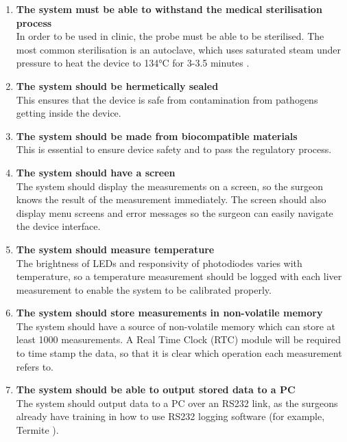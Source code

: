 \begin{enumerate}
\item \label{req: sterilise} \textbf{The system must be able to withstand the medical sterilisation process}\\
In order to be used in clinic, the probe must be able to be sterilised. The most common sterilisation is an autoclave, which uses saturated steam under pressure to heat the device to 134\si{\celsius} for 3-3.5 minutes \cite{nhs_autoclave}.

\item \label{req: seal} \textbf{The system should be hermetically sealed}\\
This ensures that the device is safe from contamination from pathogens getting inside the device.

\item \label{req: biocompatible} \textbf{The system should be made from biocompatible materials}\\
This is essential to ensure device safety and to pass the regulatory process.




\item \label{req: screen} \textbf{The system should have a screen}\\
The system should display the measurements on a screen, so the surgeon knows the result of the measurement immediately. The screen should also display menu screens and error messages so the surgeon can easily navigate the device interface.

\item \label{req: temperature} \textbf{The system should measure temperature}\\
The brightness of LEDs and responsivity of photodiodes varies with temperature, so a temperature measurement should be logged with each liver measurement to enable the system to be calibrated properly.

\item \label{req: memory} \textbf{The system should store measurements in non-volatile memory}\\
The system should have a source of non-volatile memory which can store at least 1000 measurements. A Real Time Clock (RTC) module will be required to time stamp the data, so that it is clear which operation each measurement refers to.

\item \label{req: rs232} \textbf{The system should be able to output stored data to a PC}\\
The system should output data to a PC over an RS232 link, as the surgeons already have training in how to use RS232 logging software (for example, Termite \cite{termite}).


\end{enumerate}
